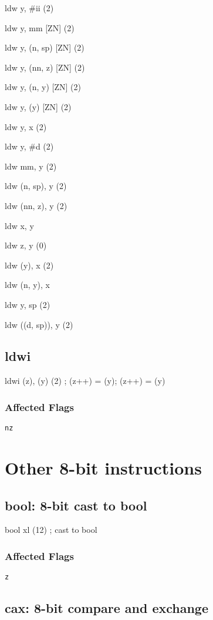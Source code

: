 \documentclass{book}
\begin{document}
ldw y, \#ii (2)

ldw y, mm [ZN] (2)

ldw y, (n, sp) [ZN] (2)

ldw y, (nn, z) [ZN] (2)

ldw y, (n, y) [ZN] (2)

ldw y, (y) [ZN] (2) 

ldw y, x (2)

ldw y, \#d (2)

ldw mm, y (2)

ldw (n, sp), y (2)

ldw (nn, z), y (2)

ldw x, y

ldw z, y (0)

ldw (y), x (2)

ldw (n, y), x

ldw y, sp (2)

ldw ((d, sp)), y (2)


\subsection{ldwi}

ldwi (z), (y) (2) ; (z++) = (y); (z++) = (y)

\subsubsection*{Affected Flags}

\texttt{nz}


\section{Other 8-bit instructions}

\subsection{bool: 8-bit cast to bool}

bool xl (12) ; cast to bool

\subsubsection*{Affected Flags}

\texttt{z}


\subsection{cax: 8-bit compare and exchange}
\end{document}
